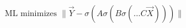 \documentclass[preview]{standalone}
\begin{document}
\begin{align*}
\text{ML minimizes } \| \vec{Y} - \sigma(A\sigma(B\sigma(\ldots C\vec{X}))) \|
\end{align*}
\end{document}
